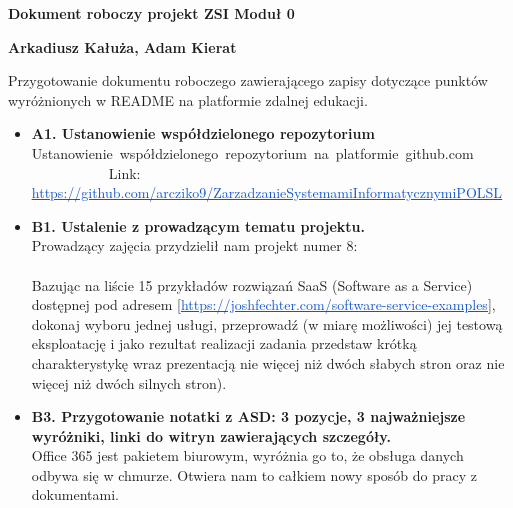 \documentclass[12pt]{article}
\renewcommand{\_}{\kern-1.5pt\textunderscore\kern-1.5pt}
\begin{document}
\textbf{Dokument roboczy projekt ZSI Moduł 0}\par


\vspace{\baselineskip}
\textbf{Arkadiusz Kałuża, Adam Kierat}\par


\vspace{\baselineskip}
Przygotowanie dokumentu roboczego zawierającego zapisy dotyczące punktów wyróżnionych w README na platformie zdalnej edukacji.\par


\vspace{\baselineskip}
\begin{itemize}
	\item \textbf{A1. Ustanowienie współdzielonego repozytorium}\\
Ustanowienie\ współdzielonego\ repozytorium\ na\ platformie\ github.com\ \ \ \ \ \ \ \ \ \ \ \ \ \ \ \       Link: \href{https://github.com/arcziko9/ZarzadzanieSystemamiInformatycznymiPOLSL}{\textcolor[HTML]{1155CC}{\ul{https://github.com/arcziko9/ZarzadzanieSystemamiInformatycznymiPOLSL}\\
}}\par

	\item \textbf{B1. Ustalenie z prowadzącym tematu projektu.}\\
Prowadzący zajęcia przydzielił nam projekt numer 8:\\
\\
Bazując na liście 15 przykładów rozwiązań SaaS (Software as a Service) dostępnej pod adresem [\href{https://joshfechter.com/software-service-examples}{\textcolor[HTML]{1155CC}{\ul{https://joshfechter.com/software-service-examples}}}], dokonaj wyboru jednej usługi, przeprowadź (w miarę możliwości) jej testową eksploatację i jako rezultat realizacji zadania przedstaw krótką charakterystykę wraz prezentacją nie więcej niż dwóch słabych stron oraz nie więcej niż dwóch silnych stron).\\
\par

	\item \textbf{B3. Przygotowanie notatki z ASD: 3 pozycje, 3 najważniejsze wyróżniki, linki do witryn zawierających szczegóły.\\
}Office 365 jest pakietem biurowym, wyróżnia go to, że obsługa danych odbywa się w chmurze. Otwiera nam to całkiem nowy sposób do pracy z dokumentami.
\end{itemize}\par
\end{document}
